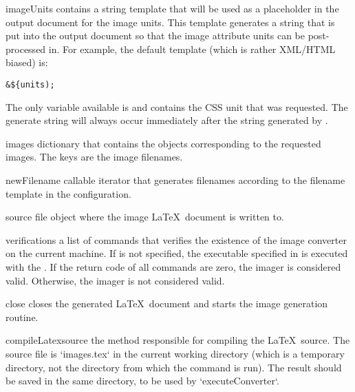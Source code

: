 \begin{memberdesc}[Imager]{imageUnits}
contains a string template that will be used as a placeholder in the 
output document for the image units.  This template generates a string
that is put into the output document so that the image attribute units
can be post-processed in.  For example, the default template (which is 
rather XML/HTML biased) is:
\begin{verbatim}
&${units);
\end{verbatim}
The only variable available is  and contains the CSS unit
that was requested.  The generate string will always occur immediately
after the string generated by .
\end{memberdesc}

\begin{memberdesc}[Imager]{images}
dictionary that contains the  objects corresponding to
the requested images.  The keys are the image filenames.
\end{memberdesc}

\begin{memberdesc}[Imager]{newFilename}
callable iterator that generates filenames according to the filename template
in the configuration.
\end{memberdesc}

\begin{memberdesc}[Imager]{source}
file object where the image \LaTeX\ document is written to.
\end{memberdesc}

\begin{memberdesc}[Imager]{verifications}
a list of commands that verifies the existence of the image converter on the
current machine. If  is not specified, the executable
specified in  is executed with the .  If
the return code of all commands are zero, the imager is considered valid.
Otherwise, the imager is not considered valid.
\end{memberdesc}


\begin{methoddesc}[Imager]{close}{}
closes the generated \LaTeX\ document and starts the image generation routine.
\end{methoddesc}

\begin{methoddesc}[Imager]{compileLatex}{source}
the method responsible for compiling the \LaTeX\ source. The source file is
`images.tex` in the current working directory (which is a temporary directory,
not the directory from which the command is run). The result should be saved in
the same directory, to be used by `executeConverter`.


\end{methoddesc}

